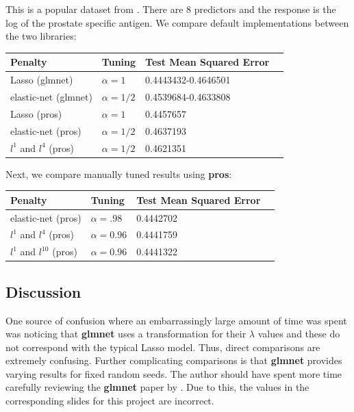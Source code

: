 \documentclass[article]{jss}
\numberwithin{equation}{section}
\begin{document}
This is a popular dataset from \cite{prostate}.
There are 8 predictors and the response is the log of the prostate specific antigen.
We compare default implementations between the two libraries:

\begin{center}
\setlength{\tabcolsep}{20pt} %
\renewcommand{\arraystretch}{1} %
\begin{tabular}{lllp{7.4cm}}
\hline
Penalty & Tuning & Test Mean Squared Error \\ \hline
Lasso (glmnet) & $\alpha = 1$ & 0.4443432-0.4646501 \\
elastic-net (glmnet) & $\alpha = 1/2$  & 0.4539684-0.4633808   \\
Lasso (pros) & $\alpha = 1$ &  0.4457657 \\
elastic-net (pros) & $\alpha = 1/2$ &  0.4637193 \\
$l^1$ and $l^{4}$ (pros) & $\alpha = 1/2$ &  0.4621351 \\ \hline
\end{tabular}
\end{center}

Next, we compare manually tuned results using \textbf{pros}:

\begin{center}
\setlength{\tabcolsep}{20pt} %
\renewcommand{\arraystretch}{1} %
\begin{tabular}{lllp{7.4cm}}
\hline
Penalty & Tuning & Test Mean Squared Error \\ \hline
elastic-net (pros) & $\alpha = .98$ & 0.4442702 \\
$l^1$ and $l^{4}$ (pros) & $\alpha = 0.96$ &  0.4441759 \\
$l^1$ and $l^{10}$ (pros) & $\alpha = 0.96$ &  0.4441322 \\ \hline
\end{tabular}
\end{center}

\subsection{Discussion}

One source of confusion where an embarrassingly large amount of time was spent was noticing that \textbf{glmnet} uses a transformation for their $\lambda$ values and these do not correspond with the typical Lasso model. Thus, direct comparisons are extremely confusing. Further complicating comparisons is that \textbf{glmnet} provides varying results for fixed random seeds.
The author should have spent more time carefully reviewing the \textbf{glmnet} paper by \cite{glmnet}. Due to this, the values in the corresponding slides for this project are incorrect. 



\end{document}

